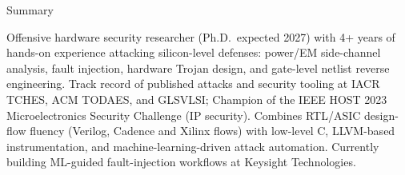 \documentclass{resume} %
\begin{document}

\begin{rSection}{Summary}

Offensive hardware security researcher (Ph.D.\ expected 2027) with 4+ years of hands-on experience attacking silicon-level defenses: power/EM side-channel analysis, fault injection, hardware Trojan design, and gate-level netlist reverse engineering. Track record of published attacks and security tooling at IACR TCHES, ACM TODAES, and GLSVLSI; Champion of the IEEE HOST 2023 Microelectronics Security Challenge (IP security). Combines RTL/ASIC design-flow fluency (Verilog, Cadence and Xilinx flows) with low-level C, LLVM-based instrumentation, and machine-learning-driven attack automation. Currently building ML-guided fault-injection workflows at Keysight Technologies.
\end{rSection}






\end{document}
